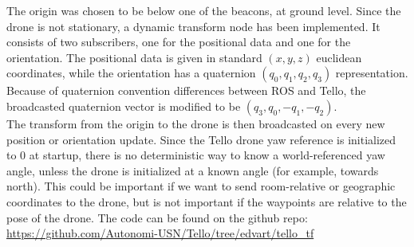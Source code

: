 \documentclass[12pt]{article}
\begin{document}
The origin was chosen to be below one of the beacons, at ground level.
Since the drone is not stationary, a dynamic transform node has been implemented. It consists of two subscribers, one for the positional data and one for the orientation. The positional data is given in standard $(x, y, z)$ euclidean coordinates, while the orientation has a quaternion $(q_0, q_1, q_2, q_3)$ representation.
Because of quaternion convention differences between ROS and Tello, the broadcasted quaternion vector is modified to be $(q_3, q_0, -q_1, -q_2)$. 
\\

The transform from the origin to the drone is then broadcasted on every new position or orientation update.
Since the Tello drone yaw reference is initialized to 0 at startup, there is no deterministic way to know a world-referenced yaw angle, unless the drone is initialized at a known angle (for example, towards north). 
This could be important if we want to send room-relative or geographic coordinates to the drone, but is not important if the waypoints are relative to the pose of the drone.
The code can be found on the github repo: \url{https://github.com/Autonomi-USN/Tello/tree/edvart/tello_tf}
\end{document}
